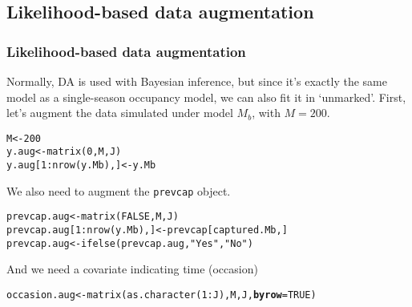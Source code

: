 \documentclass[color=usenames,dvipsnames]{beamer}\usepackage[]{graphicx}\usepackage[]{color}
\makeatletter
\newcommand{\hlnum}[1]{\textcolor[rgb]{0.69,0.494,0}{#1}}%
\newcommand{\hlstr}[1]{\textcolor[rgb]{0.749,0.012,0.012}{#1}}%
\newcommand{\hlopt}[1]{\textcolor[rgb]{0,0,0}{#1}}%
\newcommand{\hlstd}[1]{\textcolor[rgb]{0,0,0}{#1}}%
\newcommand{\hlkwb}[1]{\textcolor[rgb]{0,0.341,0.682}{#1}}%
\newcommand{\hlkwc}[1]{\textcolor[rgb]{0,0,0}{\textbf{#1}}}%
\newcommand{\hlkwd}[1]{\textcolor[rgb]{0.004,0.004,0.506}{#1}}%
\newenvironment{kframe}{%
 \def\at@end@of@kframe{}%
 \ifinner\ifhmode%
  \def\at@end@of@kframe{\end{minipage}}%
  \begin{minipage}{\columnwidth}%
 \fi\fi%
 \def\FrameCommand##1{\hskip\@totalleftmargin \hskip-\fboxsep
 \colorbox{shadecolor}{##1}\hskip-\fboxsep
     \hskip-\linewidth \hskip-\@totalleftmargin \hskip\columnwidth}%
 \MakeFramed {\advance\hsize-\width
   \@totalleftmargin\z@ \linewidth\hsize
   \@setminipage}}%
 {\par\unskip\endMakeFramed%
 \at@end@of@kframe}
\newenvironment{knitrout}{}{} %
\newcommand{\inr}[1]{\colorbox{inlinecolor}{\texttt{#1}}}
\makeatother
\begin{document}
\subsection{Likelihood-based data augmentation}


\begin{frame}[fragile]
  \frametitle{Likelihood-based data augmentation}
  \small
  Normally, DA is used with Bayesian inference, but since it's exactly
  the same model as a single-season occupancy model, we can also fit
  it in `unmarked'.
  \pause
  \vfill
  First, let's augment the data simulated under model $M_b$, with
  $M=200$.
\vspace{-6pt}
\begin{knitrout}\scriptsize
{}\color{fgcolor}\begin{kframe}
\begin{alltt}
\hlstd{M} \hlkwb{<-} \hlnum{200}
\hlstd{y.aug} \hlkwb{<-} \hlkwd{matrix}\hlstd{(}\hlnum{0}\hlstd{, M, J)}
\hlstd{y.aug[}\hlnum{1}\hlopt{:}\hlkwd{nrow}\hlstd{(y.Mb),]} \hlkwb{<-} \hlstd{y.Mb}
\end{alltt}
\end{kframe}
\end{knitrout}
\pause
\vfill
We also need to augment the \inr{prevcap} object.
\vspace{-6pt}
\begin{knitrout}\scriptsize
{}\color{fgcolor}\begin{kframe}
\begin{alltt}
\hlstd{prevcap.aug} \hlkwb{<-} \hlkwd{matrix}\hlstd{(}\hlnum{FALSE}\hlstd{, M, J)}
\hlstd{prevcap.aug[}\hlnum{1}\hlopt{:}\hlkwd{nrow}\hlstd{(y.Mb),]} \hlkwb{<-} \hlstd{prevcap[captured.Mb,]}
\hlstd{prevcap.aug} \hlkwb{<-} \hlkwd{ifelse}\hlstd{(prevcap.aug,} \hlstr{"Yes"}\hlstd{,} \hlstr{"No"}\hlstd{)}
\end{alltt}
\end{kframe}
\end{knitrout}
And we need a covariate indicating time (occasion)
\vspace{-6pt}
\begin{knitrout}\scriptsize
{}\color{fgcolor}\begin{kframe}
\begin{alltt}
\hlstd{occasion.aug} \hlkwb{<-} \hlkwd{matrix}\hlstd{(}\hlkwd{as.character}\hlstd{(}\hlnum{1}\hlopt{:}\hlstd{J), M, J,} \hlkwc{byrow}\hlstd{=}\hlnum{TRUE}\hlstd{)}
\end{alltt}
\end{kframe}
\end{knitrout}
\end{frame}
\end{document}
